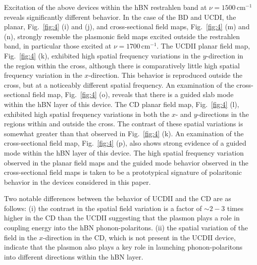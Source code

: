\documentclass[preprint,
amsmath,amssymb,
aip,
jap,
floatfix,]{revtex4-2}
\begin{document}
				Excitation of the above devices within the hBN restrahlen band at $\nu = 1500 \, \mathrm{cm}^{-1}$ reveals significantly different behavior. In the case of the BD and UCDI, the planar, Fig.~\ref{fig:4} (i) and (j), and cross-sectional field maps, Fig.~\ref{fig:4} (m) and (n), strongly resemble the plasmonic field maps excited outside the restrahlen band, in particular those excited at $\nu = 1700 \, \mathrm{cm}^{-1}$. The UCDII planar field map, Fig.~\ref{fig:4} (k), exhibited high spatial frequency variations in the $y$-direction in the region within the cross, although there is comparatively little high spatial frequency variation in the $x$-direction. This behavior is reproduced outside the cross, but at a noticeably different spatial frequency. An examination of the cross-sectional field map, Fig.~\ref{fig:4} (o), reveals that there is a guided slab mode within the hBN layer of this device. The CD planar field map, Fig.~\ref{fig:4} (l), exhibited high spatial frequency variations in both the $x$- and $y$-directions in the regions within and outside the cross. The contrast of these spatial variations is somewhat greater than that observed in Fig.~\ref{fig:4} (k). An examination of the cross-sectional field map, Fig.~\ref{fig:4} (p), also shows strong evidence of a guided mode within the hBN layer of this device. The high spatial frequency variation observed in the planar field maps and the guided mode behavior observed in the cross-sectional field maps is taken to be a prototypical signature of polaritonic behavior in the devices considered in this paper.

				Two notable differences between the behavior of UCDII and the CD are as follows: (i) the contrast in the spatial field variation is a factor of $\sim 2-3$ times higher in the CD than the UCDII suggesting that the plasmon plays a role in coupling energy into the hBN phonon-polaritons. (ii) the spatial variation of the field in the $x$-direction in the CD, which is not present in the UCDII device, indicate that the plasmon also plays a key role in launching phonon-polaritons into different directions within the hBN layer.
\end{document}
